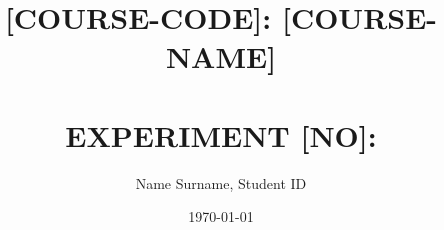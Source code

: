 \title{[COURSE-CODE]: [COURSE-NAME] \\  \\ EXPERIMENT [NO]: \\ }
\date{\today}
\author{Name Surname, Student ID}

\maketitle
